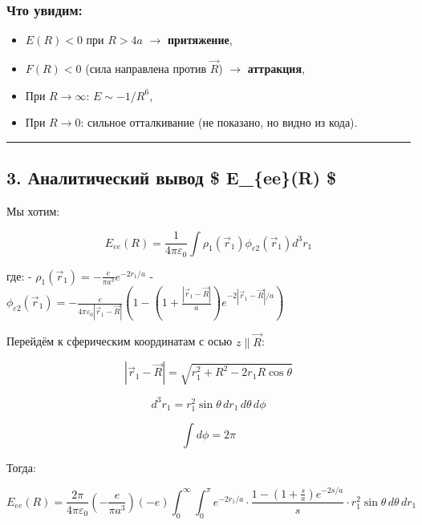 \documentclass[11pt]{article}
\providecommand{\tightlist}{%
      \setlength{\itemsep}{0pt}\setlength{\parskip}{0pt}}
\begin{document}
\subsubsection{Что
увидим:}\label{ux447ux442ux43e-ux443ux432ux438ux434ux438ux43c}

\begin{itemize}
\tightlist
\item
  \(E(R) < 0\) при \(R > 4a\) $\rightarrow$ \textbf{притяжение},
\item
  \(F(R) < 0\) (сила направлена против \(\vec{R}\)) $\rightarrow$
  \textbf{аттракция},
\item
  При \(R \to \infty\): \(E \sim -1/R^6\),
\item
  При \(R \to 0\): сильное отталкивание (не показано, но видно из кода).
\end{itemize}

\begin{center}\rule{0.5\linewidth}{\linethickness}\end{center}

\subsection{3. Аналитический вывод \$ E\_\{ee\}(R)
\$}\label{ux430ux43dux430ux43bux438ux442ux438ux447ux435ux441ux43aux438ux439-ux432ux44bux432ux43eux434-e_eer}

Мы хотим:

\[
E_{ee}(R) = \frac{1}{4\pi\varepsilon_0} \int \rho_1(\vec{r}_1) \phi_{e2}(\vec{r}_1) d^3r_1
\]

где: - \(\rho_1(\vec{r}_1) = -\frac{e}{\pi a^3} e^{-2r_1/a}\) -
\(\phi_{e2}(\vec{r}_1) = -\frac{e}{4\pi\varepsilon_0 |\vec{r}_1 - \vec{R}|} \left(1 - \left(1 + \frac{|\vec{r}_1 - \vec{R}|}{a}\right) e^{-2|\vec{r}_1 - \vec{R}|/a} \right)\)

Перейдём к сферическим координатам с осью \(z \parallel \vec{R}\):

\[
|\vec{r}_1 - \vec{R}| = \sqrt{r_1^2 + R^2 - 2 r_1 R \cos\theta}
\]

\[
d^3r_1 = r_1^2 \sin\theta\, dr_1\, d\theta\, d\phi
\]

\[
\int d\phi = 2\pi
\]

Тогда:

\[
E_{ee}(R) = \frac{2\pi}{4\pi\varepsilon_0} \left( -\frac{e}{\pi a^3} \right) (-e) \int_0^\infty \int_0^\pi
e^{-2r_1/a} \cdot \frac{1 - \left(1 + \frac{s}{a}\right) e^{-2s/a}}{s}
\cdot r_1^2 \sin\theta\, d\theta\, dr_1
\]
\end{document}
